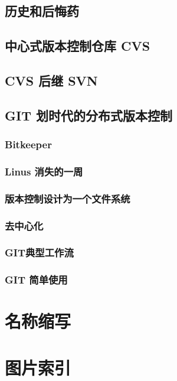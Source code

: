 \documentclass[amstex,twoside]{ctexbook}
\begin{document}
\section{   历史和后悔药	}
\section{   中心式版本控制仓库 CVS	}
\section{   CVS 后继 SVN	}
\section{GIT 划时代的分布式版本控制\label{sec:git}}
\subsection{  Bitkeeper	}
\subsection{  Linus 消失的一周	}
\subsection{  版本控制设计为一个文件系统	}
\subsection{ 去中心化	}
\subsection{  GIT典型工作流	}
\subsection{  GIT 简单使用	}


\appendix

{  }
{  }

\chapter{名称缩写}

\chapter{图片索引}
{
\renewcommand{\cleardoublepage}{}

\renewcommand\listfigurename{}
\vskip -3cm
\listoffigures 
}


\end{document}
